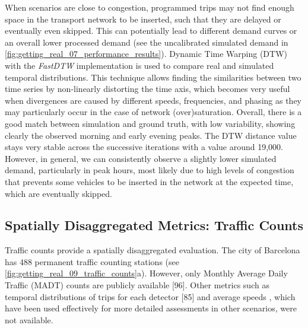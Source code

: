 When scenarios are close to congestion, programmed trips may not find enough space in the transport network to be inserted, such that they are delayed or eventually even skipped. This can potentially lead to different demand curves or an overall lower processed demand (see the uncalibrated simulated demand in \autoref{fig:getting_real_07_performance_results}). Dynamic Time Warping (DTW) \citep{Bellman1958} with the \emph{FastDTW} implementation \citep{Salvador2007} is used to compare real and simulated temporal distributions. This technique allows finding the similarities between two time series by non-linearly distorting the time axis, which becomes very useful when divergences are caused by different speeds, frequencies, and phasing as they may particularly occur in the case of network (over)saturation. Overall, there is a good match between simulation and ground truth, with low variability, showing clearly the observed morning and early evening peaks. The DTW distance value stays very stable across the successive iterations with a value around 19,000. However, in general, we can consistently observe a slightly lower simulated demand, particularly in peak hours, most likely due to high levels of congestion that prevents some vehicles to be inserted in the network at the expected time, which are eventually skipped.

\subsection{Spatially Disaggregated Metrics: Traffic Counts}

Traffic counts provide a spatially disaggregated evaluation. The city of Barcelona has 488 permanent traffic counting stations (see \autoref{fig:getting_real_09_traffic_counts}a). However, only Monthly Average Daily Traffic (MADT) counts are publicly available [96]\citep{AjuntamentdeBarcelona2019gauging}. Other metrics such as temporal distributions of trips for each detector [85] and average speeds \citep{Rodriguez-Rey2021,Yu2017}, which have been used effectively for more detailed assessments in other scenarios, were not available.

